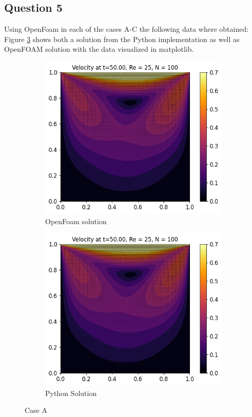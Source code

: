 \documentclass[10pt]{report}
\begin{document}
\subsection*{Question 5}
Using OpenFoam in each of the cases A-C the following data where obtained: Figure \ref{caseA} shows
both a solution from the Python implementation as well as OpenFOAM solution with the data visualized in matplotlib.

\begin{figure}[H]
    \centering
    \begin{subfigure}[b]{0.475\textwidth}
        \centering
        \includegraphics[width=\textwidth]{plots/velocity_RE25_OF.png}
        \caption{OpenFoam solution}
        \label{caseAof}
    \end{subfigure}
    \hfill
    \begin{subfigure}[b]{0.475\textwidth}
        \centering
        \includegraphics[width=\textwidth]{plots/velocity_RE25.png}
        \caption{Python Solution}
        \label{caseApy}
    \end{subfigure}
    \caption{Case A}
    \label{caseA}
\end{figure}
\end{document}
